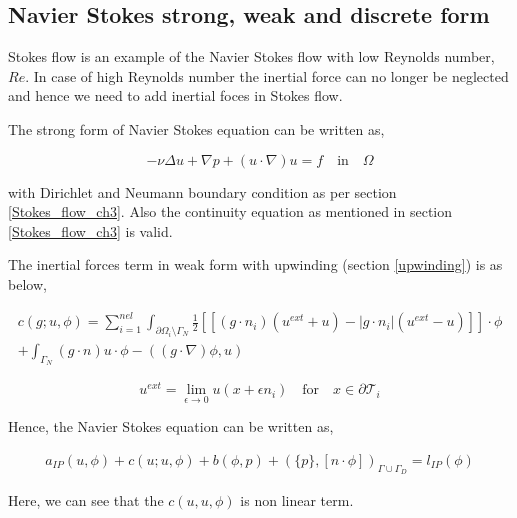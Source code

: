 \documentclass[a4paper]{book}
\begin{document}
\subsection{Navier Stokes strong, weak and discrete form} \label{n_s_ch3}

Stokes flow is an example of the Navier Stokes flow with low Reynolds number, $Re$. In case of high Reynolds number the inertial force can no longer be neglected and hence we need to add inertial foces in Stokes flow. 

The strong form of Navier Stokes equation can be written as,

\begin{equation} \label{navier_stokes_strong_ch3}
-\nu \Delta u + \nabla p + (u \cdot \nabla) u = f \quad \textrm{in} \quad \Omega
\end{equation}

with Dirichlet and Neumann boundary condition as per section \ref{Stokes_flow_ch3}. Also the continuity equation as mentioned in section \ref{Stokes_flow_ch3} is valid.

The inertial forces term in weak form with upwinding (section \ref{upwinding}) is as below,

\begin{equation}
\begin{split}
c(g;u,\phi) = \sum_{i=1}^{nel} \int_{\partial \Omega_i \setminus \Gamma_N} \frac{1}{2} [[(g \cdot n_i)(u^{ext} + u) - |g \cdot n_i|(u^{ext} - u)]] \cdot \phi \\ + \int_{\Gamma_N} (g\cdot n) u \cdot \phi -((g\cdot \nabla)\phi,u)
\end{split}
\end{equation}

\begin{equation} \label{uext}
u^{ext} = \lim_{\epsilon \rightarrow 0} u(x+\epsilon n_i) \quad  \textrm{for} \quad x \in \partial \mathcal{T}_i
\end{equation}

Hence, the Navier Stokes equation can be written as,

\begin{equation}\label{navier_stokes_weak_ch3}
\begin{split}
a_{IP}(u,\phi) + c(u;u,\phi) + b(\phi,p) + (\{p\},[n\cdot \phi])_{\Gamma \cup \Gamma_D} = l_{IP}(\phi) 
\end{split}
\end{equation}

Here, we can see that the $c(u,u,\phi)$ is non linear term.
\end{document}
